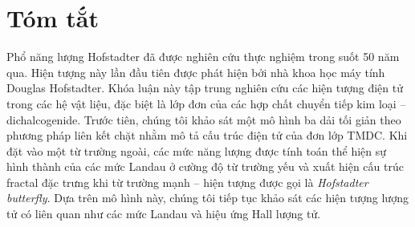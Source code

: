 {\selectfont 
\chapter*{Tóm tắt}
Phổ năng lượng Hofstadter đã được nghiên cứu thực nghiệm trong suốt 50 năm qua. Hiện tượng này lần đầu tiên được phát hiện bởi nhà khoa học máy tính Douglas Hofstadter. Khóa luận này tập trung nghiên cứu các hiện tượng điện tử trong các hệ vật liệu, đặc biệt là lớp đơn của các hợp chất chuyển tiếp kim loại – dichalcogenide. Trước tiên, chúng tôi khảo sát một mô hình ba dải tối giản theo phương pháp liên kết chặt nhằm mô tả cấu trúc điện tử của đơn lớp TMDC. Khi đặt vào một từ trường ngoài, các mức năng lượng được tính toán thể hiện sự hình thành của các mức Landau ở cường độ từ trường yếu và xuất hiện cấu trúc fractal đặc trưng khi từ trường mạnh – hiện tượng được gọi là \textit{Hofstadter butterfly}. Dựa trên mô hình này, chúng tôi tiếp tục khảo sát các hiện tượng lượng tử có liên quan như các mức Landau và hiệu ứng Hall lượng tử.
}
